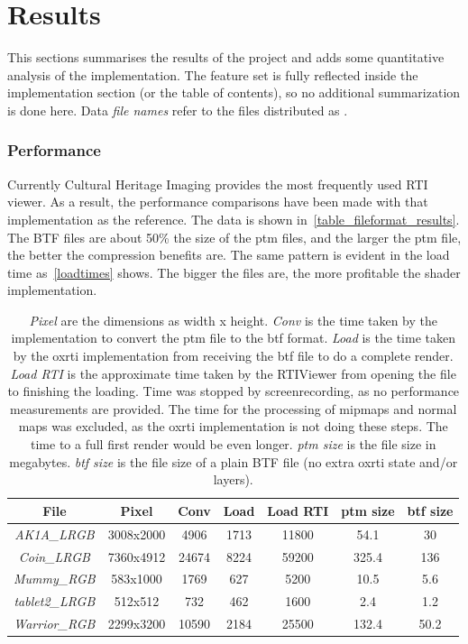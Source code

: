 \section{Results}
This sections summarises the results of the project and adds some quantitative
analysis of the implementation. The feature set is fully reflected inside the
implementation section (or the table of contents), so no additional
summarization is done here. Data \emph{file names} refer to the files distributed as \cite*{goslar_oxrti_data:_2018}.

\subsubsection{Performance}
Currently Cultural Heritage Imaging provides the most frequently used RTI viewer\cite*{noauthor_cultural_nodate-1}. As a result, the performance comparisons have been made with that implementation as the reference. The data is shown
in~\autoref{table_fileformat_results}. The BTF files are about 50\% the size of
the ptm files, and the larger the ptm file, the better the compression benefits are.
The same pattern is evident in the load time as~\autoref{loadtimes} shows. The
bigger the files are, the more profitable the shader implementation.

\begin{table}[H]
\begin{tabular}{|c |  c c c c c c|}
 \hline
 File & Pixel & Conv & Load & Load RTI & ptm size & btf size\\
  \hline
  \emph{AK1A\_LRGB} & 3008x2000 & 4906 & 1713 & 11800 & 54.1 & 30  \\
  \emph{Coin\_LRGB} & 7360x4912 & 24674 & 8224 & 59200 & 325.4 & 136  \\
  \emph{Mummy\_RGB} & 583x1000 & 1769 & 627 & 5200 & 10.5 & 5.6  \\
  \emph{tablet2\_LRGB} & 512x512 & 732 & 462 & 1600 & 2.4 & 1.2  \\
  \emph{Warrior\_RGB} & 2299x3200 & 10590 & 2184 & 25500 & 132.4 & 50.2  \\
 \hline
\end{tabular}
\caption[Performance Comparison]{\emph{Pixel} are the dimensions as width x height. \emph{Conv} is the time taken
by the implementation to convert the ptm file to the btf format. \emph{Load} is
the time taken by the oxrti implementation from receiving the btf file to do a complete render. \emph{Load
  RTI} is the approximate time taken by the RTIViewer from opening the file to
finishing the loading. Time was stopped by screenrecording, as no performance
measurements are provided. The time for the processing of mipmaps and normal
maps was excluded, as the oxrti implementation is not doing these steps. The
time to a full first render would be even longer. \emph{ptm size} is the file size in
megabytes. \emph{btf size} is the file size of a plain BTF file (no extra oxrti
state and/or layers).}
\label{table_fileformat_results}
\end{table}

